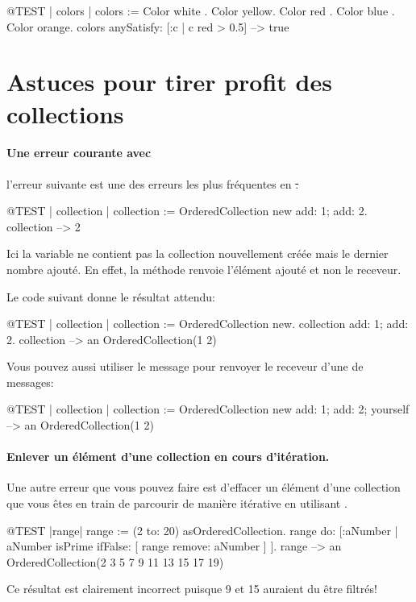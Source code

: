 \documentclass[a4paper,10pt,twoside]{book}
\begin{document}
\begin{code}{@TEST | colors | colors := {Color white . Color yellow. Color red . Color blue . Color orange}.}
colors anySatisfy: [:c | c red > 0.5] --> true
\end{code}
\section{Astuces pour tirer profit des collections}

\paragraph{Une erreur courante avec } l'erreur
suivante est une des erreurs les plus fréquentes en \st.

\begin{code}{@TEST | collection | }
collection := OrderedCollection new add: 1; add: 2.
collection --> 2
\end{code}
\noindent
Ici la variable  ne contient pas la collection nouvellement créée mais le dernier nombre ajouté.
En effet, la méthode  renvoie l'élément ajouté et non le receveur.

Le code suivant donne le résultat attendu:
\begin{code}{@TEST | collection |}
collection := OrderedCollection new.
collection add: 1; add: 2.
collection --> an OrderedCollection(1 2)
\end{code}

Vous pouvez aussi utiliser le message  pour
renvoyer le receveur d'une  de messages:

\begin{code}{@TEST | collection |}
collection := OrderedCollection new add: 1; add: 2; yourself --> an OrderedCollection(1 2)
\end{code}

\paragraph{Enlever un élément d'une collection en cours d'itération.}
Une autre erreur que vous pouvez faire est d'effacer un élément d'une collection que vous êtes en train de parcourir de manière itérative en utilisant .
\begin{code}{@TEST |range|}
range := (2 to: 20) asOrderedCollection.
range do: [:aNumber | aNumber isPrime ifFalse: [ range remove: aNumber ] ].
range --> an OrderedCollection(2 3 5 7 9 11 13 15 17 19)
\end{code}
\noindent
Ce résultat est clairement incorrect puisque 9 et 15 auraient du être filtrés!
\end{document}
